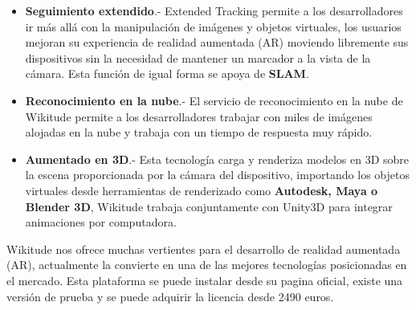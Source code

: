 \begin{itemize}
	\item \textbf{Seguimiento extendido}.- Extended Tracking permite a los desarrolladores ir más allá con la manipulación de imágenes y objetos virtuales, los usuarios mejoran su experiencia de realidad aumentada (AR) moviendo libremente sus dispositivos sin la necesidad de mantener un marcador a la vista de la cámara. Esta función de igual forma se apoya de \textbf{SLAM}. 
	
	\item \textbf{Reconocimiento en la nube}.- El servicio de reconocimiento en la nube de Wikitude permite a los desarrolladores trabajar con miles de imágenes alojadas en la nube y trabaja con un tiempo de respuesta muy rápido.
	
	\item \textbf{Aumentado en 3D}.- Esta tecnología carga y renderiza modelos en 3D sobre la escena proporcionada por la cámara del dispositivo, importando los objetos virtuales desde herramientas de renderizado como \textbf{Autodesk, Maya o Blender 3D}, Wikitude trabaja conjuntamente con Unity3D para integrar animaciones por computadora\cite{B16}.
	
\end{itemize}
\noindent
Wikitude nos ofrece muchas vertientes para el desarrollo de realidad aumentada (AR), actualmente la convierte en una de las mejores tecnologías posicionadas en el mercado. Esta plataforma se puede instalar desde su pagina oficial, existe una versión de prueba y se puede adquirir la licencia desde 2490 euros\cite{B16}. 

